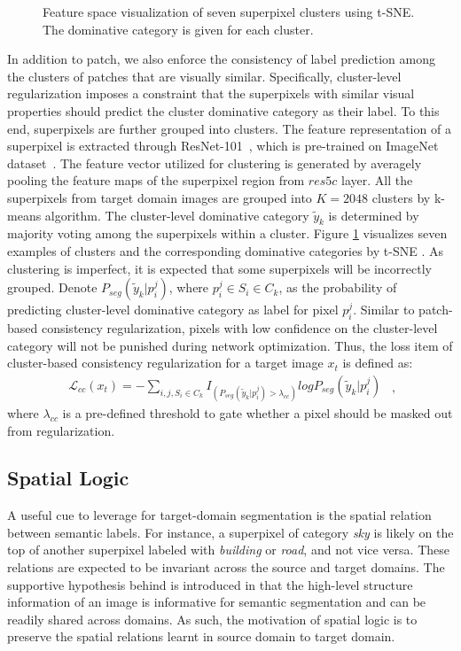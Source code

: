 \documentclass[10pt,twocolumn,letterpaper]{article}
\begin{document}
\begin{figure}[!tb]
   \caption{\small Feature space visualization of seven superpixel clusters using t-SNE. The dominative category is given for each cluster.}
   \label{fig:cluster}
   \vspace{-0.15in}
\end{figure}
In addition to patch, we also enforce the consistency of label prediction among the clusters of patches that are visually similar. Specifically, cluster-level regularization imposes a constraint that the superpixels with similar visual properties should predict the cluster dominative category as their label. To this end, superpixels are further grouped into clusters. The feature representation of a superpixel is extracted through ResNet-101~\cite{he2016deep}, which is pre-trained on ImageNet dataset~\cite{ILSVRC15}. The feature vector utilized for clustering is generated by averagely pooling the feature maps of the superpixel region from $res5c$ layer.
All the superpixels from target domain images are grouped into $K=2048$ clusters by k-means algorithm. The cluster-level dominative category $\tilde{y}_k$ is determined by majority voting among the superpixels within a cluster. Figure \ref{fig:cluster} visualizes seven examples of clusters and the corresponding dominative categories by t-SNE \cite{maaten:JMLR08}. As clustering is imperfect, it is expected that some superpixels will be incorrectly grouped. Denote $P_{seg}(\tilde{y}_k| p^j_i)$, where $p^j_i \in S_i \in C_k$, as the probability of predicting cluster-level dominative category as label for pixel $p^j_i$. Similar to patch-based consistency regularization, pixels with low confidence on the cluster-level category will not be punished during network optimization. Thus, the loss item of cluster-based consistency regularization for a target image $x_t$ is defined as:
\begin{equation}\label{eq:pc}
\begin{aligned}
\mathcal{L}_{cc}(x_t)=- \sum_{i, j, S_i \in C_k} I_{(P_{seg}(\tilde{y}_k| p^j_i)>\lambda_{cc})} log P_{seg}(\tilde{y}_k| p^j_i)
\end{aligned}~~,
\end{equation}
where $\lambda_{cc}$ is a pre-defined threshold to gate whether a pixel should be masked out from regularization.


\subsection{Spatial Logic}
A useful cue to leverage for target-domain segmentation is the spatial relation between semantic labels. For instance, a superpixel of category \emph{sky} is likely on the top of another superpixel labeled with \emph{building} or \emph{road}, and not vice versa. These relations are expected to be invariant across the source and target domains. The supportive hypothesis behind is introduced in \cite{chang2019all} that the high-level structure information of an image is informative for semantic segmentation and can be readily shared across domains. As such, the motivation of spatial logic is to preserve the spatial relations learnt in source domain to target domain.
\end{document}
